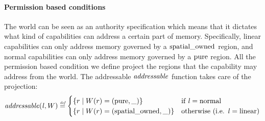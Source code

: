 \begin{jversion}

\paragraph{Permission based conditions}
\label{par:perm-cond}
The world can be seen as an authority specification which means that it dictates what kind of capabilities can address a certain part of memory.
Specifically, linear capabilities can only address memory governed by a $\mathrm{spatial\_owned}$ region, and normal capabilities can only address memory governed by a $\mathrm{pure}$ region.
All the permission based condition we define project the regions that the capability may address from the world.
The addressable $\addressable{}$ function takes care of the projection:
\[
  \addressable{\lin,W} \defeq
  \begin{cases}
    \{ r \mid W(r) = (\pure,\_) \} & \text{if $\lin = \normal$} \\
    \{ r \mid W(r) = (\spatialo,\_) \}  & \text{otherwise (i.e. $\lin = \linear$)} \\
  \end{cases}
\]


\end{jversion}
